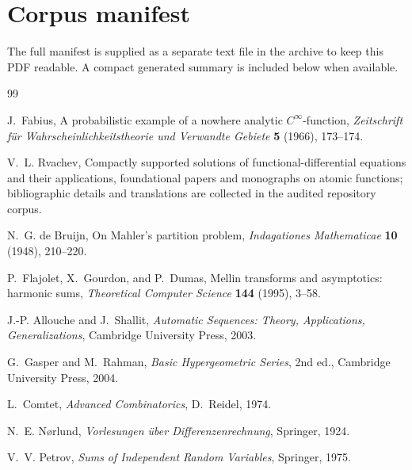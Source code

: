 \documentclass[11pt,oneside]{article}
\theoremstyle{definition}
\theoremstyle{remark}
\begin{document}
\section{Corpus manifest}

The full manifest is supplied as a separate text file in the archive to keep this PDF
readable.  A compact generated summary is included below when available.


\begin{thebibliography}{99}

J.~Fabius,
\newblock A probabilistic example of a nowhere analytic $C^\infty$-function,
\newblock \emph{Zeitschrift f\"ur Wahrscheinlichkeitstheorie und Verwandte Gebiete}
\textbf{5} (1966), 173--174.

V.~L. Rvachev,
\newblock Compactly supported solutions of functional-differential equations and their
applications,
\newblock foundational papers and monographs on atomic functions; bibliographic details
and translations are collected in the audited repository corpus.

N.~G. de Bruijn,
\newblock On Mahler's partition problem,
\newblock \emph{Indagationes Mathematicae} \textbf{10} (1948), 210--220.

P.~Flajolet, X.~Gourdon, and P.~Dumas,
\newblock Mellin transforms and asymptotics: harmonic sums,
\newblock \emph{Theoretical Computer Science} \textbf{144} (1995), 3--58.

J.-P. Allouche and J.~Shallit,
\newblock \emph{Automatic Sequences: Theory, Applications, Generalizations},
\newblock Cambridge University Press, 2003.

G.~Gasper and M.~Rahman,
\newblock \emph{Basic Hypergeometric Series}, 2nd ed.,
\newblock Cambridge University Press, 2004.

L.~Comtet,
\newblock \emph{Advanced Combinatorics},
\newblock D.~Reidel, 1974.

N.~E. N\o rlund,
\newblock \emph{Vorlesungen \"uber Differenzenrechnung},
\newblock Springer, 1924.

V.~V. Petrov,
\newblock \emph{Sums of Independent Random Variables},
\newblock Springer, 1975.


\end{thebibliography}
\end{document}

